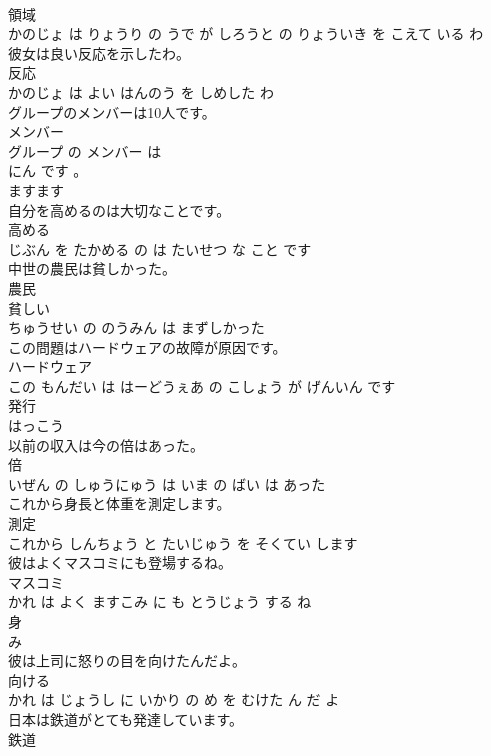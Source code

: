 \documentclass[8pt]{extreport}
\begin{document}
\begin{CJK}{UTF8}{min}
\\	領域 
\\	かのじょ は りょうり の うで が しろうと の りょういき を こえて いる わ			
\\	彼女は良い反応を示したわ。	
\\	反応 
\\	かのじょ は よい はんのう を しめした わ			
\\	グループのメンバーは10人です。	
\\	メンバー 
\\	グループ の メンバー は 
\\	にん です 。			
\\	ますます	
\\	自分を高めるのは大切なことです。	
\\	高める 
\\	じぶん を たかめる の は たいせつ な こと です			
\\	中世の農民は貧しかった。	
\\	農民 
\\	貧しい 
\\	ちゅうせい の のうみん は まずしかった			
\\	この問題はハードウェアの故障が原因です。	
\\	ハードウェア 
\\	この もんだい は はーどうぇあ の こしょう が げんいん です			
\\	発行	
\\	はっこう		
\\	以前の収入は今の倍はあった。	
\\	倍 
\\	いぜん の しゅうにゅう は いま の ばい は あった			
\\	これから身長と体重を測定します。	
\\	測定 
\\	これから しんちょう と たいじゅう を そくてい します			
\\	彼はよくマスコミにも登場するね。	
\\	マスコミ 
\\	かれ は よく ますこみ に も とうじょう する ね			
\\	身	
\\	み		
\\	彼は上司に怒りの目を向けたんだよ。	
\\	向ける 
\\	かれ は じょうし に いかり の め を むけた ん だ よ			
\\	日本は鉄道がとても発達しています。	
\\	鉄道 

\end{CJK}
\end{document}
